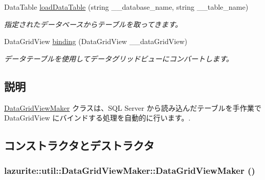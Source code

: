 \begin{DoxyCompactItemize}
DataTable \hyperlink{classlazurite_1_1util_1_1_data_grid_view_maker_a0ba85be729407fe9b20928061a4d4ce9}{loadDataTable} (string \_\-\_\-database\_\-name, string \_\-\_\-table\_\-name)
\begin{DoxyCompactList}\small\item\em 指定されたデータベースからテーブルを取ってきます。 \item\end{DoxyCompactList}\item 
DataGridView \hyperlink{classlazurite_1_1util_1_1_data_grid_view_maker_aa07340c1021a0749c64ffa0cca0bcd7d}{binding} (DataGridView \_\-\_\-dataGridView)
\begin{DoxyCompactList}\small\item\em データテーブルを使用してデータグリッドビューにコンバートします。 \item\end{DoxyCompactList}\end{DoxyCompactItemize}


\subsection{説明}
\hyperlink{classlazurite_1_1util_1_1_data_grid_view_maker}{DataGridViewMaker} クラスは、SQL Server から読み込んだテーブルを手作業で DataGridView にバインドする処理を自動的に行います。. 

\subsection{コンストラクタとデストラクタ}
\hypertarget{classlazurite_1_1util_1_1_data_grid_view_maker_a66d146863c2d9a0c5571809f11bb671e}{
\subsubsection[{DataGridViewMaker}]{\setlength{\rightskip}{0pt plus 5cm}lazurite::util::DataGridViewMaker::DataGridViewMaker ()}}
\label{classlazurite_1_1util_1_1_data_grid_view_maker_a66d146863c2d9a0c5571809f11bb671e}


